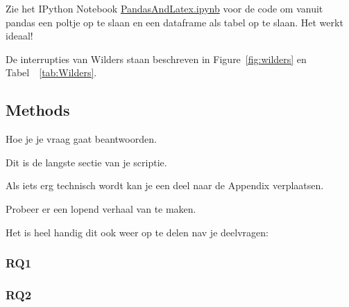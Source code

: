 Zie het IPython Notebook \url{PandasAndLatex.ipynb} voor de code om vanuit pandas een poltje op te slaan en een dataframe als tabel op te slaan. Het werkt ideaal! 

De interrupties van Wilders staan beschreven in Figure~\ref{fig:wilders} en Tabel~~\ref{tab:Wilders}.




\pagebreak



\pagebreak
\subsection{Methods}
Hoe je je vraag gaat beantwoorden.


Dit is de langste sectie van je scriptie. 

Als iets erg technisch wordt kan je een deel naar de Appendix verplaatsen. 

Probeer er een lopend verhaal van te maken.

Het is heel handig dit ook weer op te delen nav je deelvragen:

\subsubsection{RQ1}

\subsubsection{RQ2}
